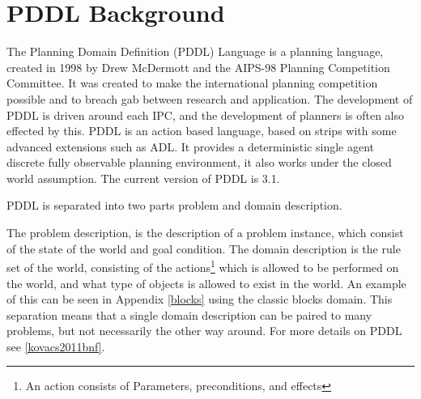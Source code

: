 \section{PDDL Background}
The Planning Domain Definition (PDDL) Language is a planning language, created in 1998 by Drew McDermott and the AIPS-98 Planning Competition Committee. It was created to make the international planning competition possible and to breach gab between research and application. The development of PDDL is driven around each IPC, and the development of planners is often also effected by this.
PDDL is an action based language, based on strips with some advanced extensions such as ADL. 
It provides a deterministic single agent discrete fully observable planning environment, it also works under the closed world assumption. The current version of PDDL is 3.1.

PDDL is separated into two parts problem and domain description. 

The problem description, is the description of a problem instance, which consist of the state of the world and goal condition. The domain description is the rule set of the world, consisting of the actions\footnote{An action consists of Parameters, preconditions, and effects} which is allowed to be performed on the world, and what type of objects is allowed to exist in the world. An example of this can be seen in Appendix \ref{blocks} using the classic blocks domain. This separation means that a single domain description can be paired to many problems, but not necessarily the other way around. For more details on PDDL see \ref{kovacs2011bnf}.
